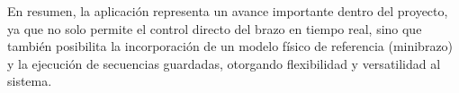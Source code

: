 En resumen, la aplicación representa un avance importante dentro del proyecto, ya que no solo permite el control directo del brazo en tiempo real, sino que también posibilita la incorporación de un modelo físico de referencia (minibrazo) y la ejecución de secuencias guardadas, otorgando flexibilidad y versatilidad al sistema.
